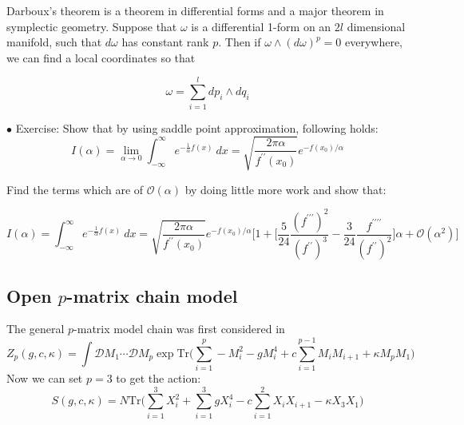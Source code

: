 \documentclass[11pt]{article}
\begin{document}
Darboux's theorem is a theorem in differential forms and 
a major theorem in symplectic geometry. 
Suppose that $\omega$  is a differential 1-form on an $2l$ dimensional manifold, such that $d \omega$ has constant rank $p$. Then if $ \omega \wedge (d\omega)^p = 0 $ everywhere, we can find a local coordinates so that 

\begin{equation}
	\omega = \sum_{i=1}^{l} dp_{i} \wedge dq_{i}
\end{equation}


\begin{mdframed}[backgroundcolor=blue!3] 
	\textsc{} 
	$\bullet$ Exercise: Show that by using saddle point approximation, following holds:
	\begin{equation*}
	I(\alpha) = \lim_{\alpha \to 0} \int_{-\infty}^{\infty} e^{-\frac{1}{\alpha}f(x)} ~dx = \sqrt{\frac{2\pi \alpha}{f^{\prime\prime}(x_{0})}} e^{-f(x_{0})/\alpha} 
	\end{equation*}
	
	Find the terms which are of $\mathcal{O}(\alpha)$ by doing little more work and show that:
	
	\begin{equation*}
	I(\alpha) = \int_{-\infty}^{\infty} e^{-\frac{1}{\alpha}f(x)} ~dx = \sqrt{\frac{2\pi \alpha}{f^{\prime\prime}(x_{0})}} e^{-f(x_{0})/\alpha} \Bigg[1 + 
	\Big[ \frac{5}{24} \frac{(f^{\prime\prime\prime})^2}{(f^{\prime\prime})^3} - \frac{3}{24} \frac{f^{\prime\prime\prime\prime}}{(f^{\prime\prime})^2}\Big] \alpha + \mathcal{O}(\alpha^{2})\Bigg]
	\end{equation*}
	
	
\end{mdframed} 




\subsection{Open $p$-matrix chain model}

The general $p$-matrix model chain was first considered in \cite{Chadha:1980ri} 
\begin{equation}
\label{eq:Mehta1} 
Z_{p}(g,c,\kappa) = \int \mathcal{D}M_{1} \cdots  \mathcal{D}M_{p} \exp \mathrm{Tr}\Bigg(\sum_{i=1}^{p} -M_{i}^2  - g M_{i}^{4} + c \sum_{i=1}^{p-1} M_{i}M_{i+1} 
+ \kappa M_{p}M_{1} \Bigg)
\end{equation}
Now we can set $p=3$ to get the action: 
 \begin{equation}
\label{eq:Mehta2} 
S(g,c,\kappa) = N \mathrm{Tr}\Bigg(\sum_{i=1}^{3} X_{i}^2  + \sum_{i=1}^{3} g X_{i}^{4} - c \sum_{i=1}^{2} X_{i}X_{i+1} 
- \kappa X_{3}X_{1} \Bigg)
\end{equation}
\end{document}
